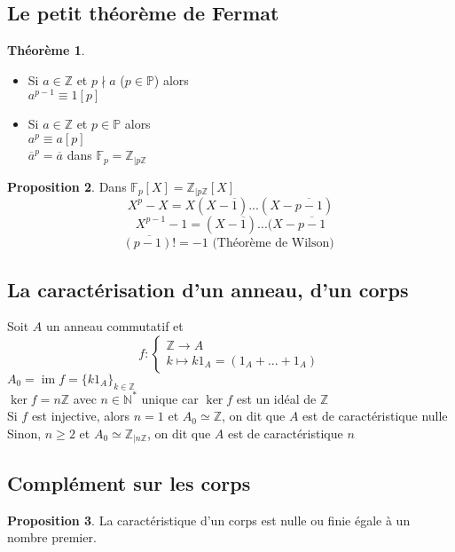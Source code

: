 \documentclass[10pt,a4paper]{article}
\theoremstyle{definition}
\newtheorem{proposition}{Proposition}[section]
\newtheorem{theorem}[proposition]{Théorème}
\DeclareMathOperator{\im}{im}
\begin{document}
\subsection{Le petit théorème de Fermat}
\begin{theorem}
\hfill \begin{itemize}
\item Si $a \in \mathbb{Z}$ et $p \nmid a$ ($p \in \mathbb{P}$) alors \\
$a^{p - 1} \equiv 1 [p]$
\item Si $a \in \mathbb{Z}$ et $p \in \mathbb{P}$ alors \\
$a^p \equiv a [p]$ \\
$\overline{a}^p = \overline{a}$ dans $\mathbb{F}_p = \mathbb{Z}_{|p\mathbb{Z}}$
\end{itemize}
\end{theorem}
\begin{proposition}
Dans $\mathbb{F}_p[X] = \mathbb{Z}_{|p\mathbb{Z}}[X]$
\[ X^p - X = X(X - \overline{1}) ... (X - \overline{p - 1}) \]
\[ X^{p - 1} - 1 = (X - \overline{1}) ... (X - \overline{p - 1} \]
\[ \overline{(p - 1)!} = -1 \text{ (Théorème de Wilson) }\] 
\end{proposition}

\subsection{La caractérisation d'un anneau, d'un corps}
\noindent Soit $A$ un anneau commutatif et 
\[ f: \begin{cases}
\mathbb{Z} \to A \\
k \mapsto k 1_A = (1_A + ... + 1_A)
\end{cases} \]
$A_0 = \im f = \{k 1_A \}_{k \in \mathbb{Z}}$ \\
$\ker f = n \mathbb{Z}$ avec $n \in \mathbb{N}^*$ unique car $\ker f$ est un idéal de $\mathbb{Z}$ \\
Si $f$ est injective, alors $n = 1$ et $A_0 \simeq \mathbb{Z}$, on dit que $A$ est de caractéristique nulle \\
Sinon, $n \geq 2$ et $A_0 \simeq \mathbb{Z}_{|n\mathbb{Z}}$, on dit que $A$ est de caractéristique $n$

\subsection{Complément sur les corps}
\begin{proposition}
La caractéristique d'un corps est nulle ou finie égale à un nombre premier.
\end{proposition}
\end{document}
